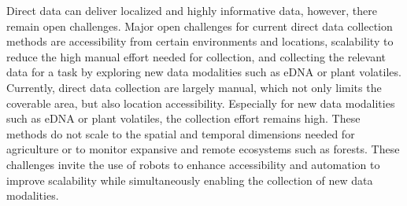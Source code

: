 

Direct data can deliver localized and highly informative data, however, there remain open challenges.
Major open challenges for current direct data collection methods are accessibility from certain environments and locations, scalability to reduce the high manual effort needed for collection, and collecting the relevant data for a task by exploring new data modalities such as eDNA or plant volatiles.
Currently, direct data collection are largely manual, which not only limits the coverable area, but also location accessibility. Especially for new data modalities such as eDNA or plant volatiles, the collection effort remains high. These methods do not scale to the spatial and temporal dimensions needed for agriculture or to monitor expansive and remote ecosystems such as forests. These challenges invite the use of robots to enhance accessibility and automation to improve scalability while simultaneously enabling the collection of new data modalities. %

